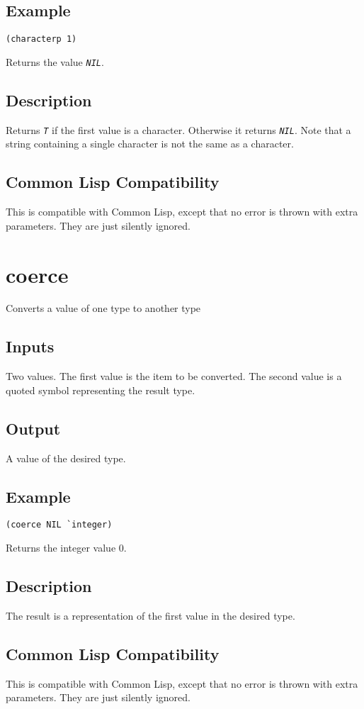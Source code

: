 \documentclass[10pt, openany]{book}
\newcommand{\constant}[1]{\emph{\texttt{#1}}}
\newcommand{\cl}{Common Lisp}
\begin{document}
\subsection{Example}
\begin{lstlisting}
(characterp 1)
\end{lstlisting}
Returns the value \constant{NIL}.
\subsection{Description}
Returns \constant{T} if the first value is a character.  Otherwise it returns \constant{NIL}.  Note that a string containing a single character is not the same as a character.
\subsection{Common Lisp Compatibility}
This is compatible with \cl, except that no error is thrown with extra parameters.  They are just silently ignored.

\section{coerce}
Converts a value of one type to another type
\subsection{Inputs}
Two values.  The first value is the item to be converted.  The second value is a quoted symbol representing the result type.
\subsection{Output}
A value of the desired type.
\subsection{Example}
\begin{lstlisting}
(coerce NIL `integer)
\end{lstlisting}
Returns the integer value 0.
\subsection{Description}
The result is a representation of the first value in the desired type.
\subsection{Common Lisp Compatibility}
This is compatible with \cl, except that no error is thrown with extra parameters.  They are just silently ignored.
\end{document}
